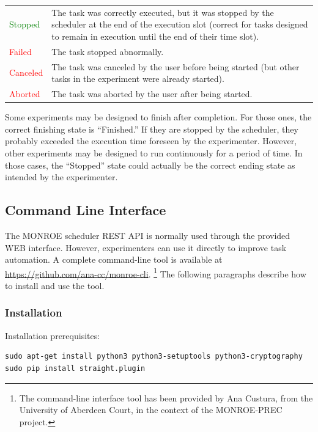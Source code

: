 \documentclass[a4paper,10pt]{article}
\newcommand{\VerbatimFont}{\footnotesize}
\newcommand{\monroe}{MONROE}
\begin{document}
\begin{table}[tp]
\begin{center}
\begin{tabular*}{1\textwidth}{p{}p{}}
			\textcolor{green}{Stopped} & The task was correctly executed, but it was stopped by the scheduler at the end of the execution slot (correct for tasks designed to remain in execution until the end of their time slot).\\
			\textcolor{red}{Failed} & The task stopped abnormally.\\
			\textcolor{red}{Canceled} & The task was canceled by the user before being started (but other tasks in the experiment were already started).\\
			\textcolor{red}{Aborted} & The task was aborted by the user after being started.\\
			\bottomrule
		\end{tabular*}
	\end{center}
\end {table}

Some experiments may be designed to finish after completion.
For those ones, the correct finishing state is ``Finished.''
If they are stopped by the scheduler, they probably exceeded the execution time foreseen by the experimenter.
However, other experiments may be designed to run continuously for a period of time.
In those cases, the ``Stopped'' state could actually be the correct ending state as intended by the experimenter.

\FloatBarrier{}
\subsection{Command Line Interface}
\label{subsec:cli}

The \monroe{} scheduler REST API is normally used through the provided WEB interface.
However, experimenters can use it directly to improve task automation.
A complete command-line tool is available at \url{https://github.com/ana-cc/monroe-cli}.%
\footnote{The command-line interface tool has been provided by Ana Custura, from the University of Aberdeen Court, in the context of the MONROE-PREC project.}
The following paragraphs describe how to install and use the tool.

\subsubsection{Installation}

Installation prerequisites:
{\VerbatimFont\begin{verbatim}
sudo apt-get install python3 python3-setuptools python3-cryptography
sudo pip install straight.plugin
\end{verbatim}}
\end{document}
